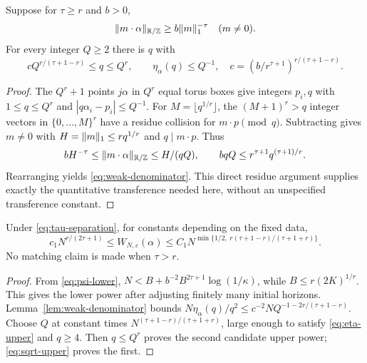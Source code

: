 \begin{lemma}\label{lem:weak-denominator}
Suppose for $\tau\ge r$ and $b>0$,
\begin{equation}\label{eq:tau-separation}
        \lVert m\cdot\alpha\rVert_{\mathbb R/\mathbb Z}\ge b\lVert m\rVert_1^{-\tau}
                         \quad(m\ne0).
\end{equation}
For every integer $Q\ge2$ there is $q$ with
\begin{equation}\label{eq:weak-denominator}
 cQ^{r/(\tau+1-r)}\le q\le Q^r,
 \qquad\eta_\alpha(q)\le Q^{-1},
 \quad c=(b/r^{\tau+1})^{r/(\tau+1-r)}.
\end{equation}
\end{lemma}
\begin{proof}
The $Q^r+1$ points $j\alpha$ in $Q^r$ equal torus boxes give integers $p_i,q$ with $1\le q\le Q^r$ and $|q\alpha_i-p_i|\le Q^{-1}$. For $M=\lfloor q^{1/r}\rfloor$, the $(M+1)^r>q$ integer vectors in $\{0,\ldots,M\}^r$ have a residue collision for $m\cdot p\pmod q$. Subtracting gives $m\ne0$ with $H=\lVert m\rVert_1\le r q^{1/r}$ and $q\mid m\cdot p$. Thus
\[
 bH^{-\tau}\le\lVert m\cdot\alpha\rVert_{\mathbb R/\mathbb Z}\le H/(qQ),
 \qquad bqQ\le r^{\tau+1}q^{(\tau+1)/r}.
\]
Rearranging yields \eqref{eq:weak-denominator}. This direct residue argument supplies exactly the quantitative transference needed here, without an unspecified transference constant.
\end{proof}

\begin{corollary}\label{cor:power-type}
Under \eqref{eq:tau-separation}, for constants depending on the fixed data,
\begin{equation}\label{eq:power-bracket}
 c_1N^{r/(2\tau+1)}\le W_{N,\varepsilon}(\alpha)
 \le C_1N^{\min\{1/2,\ r(\tau+1-r)/(\tau+1+r)\}}.
\end{equation}
No matching claim is made when $\tau>r$.
\end{corollary}
\begin{proof}
From \eqref{eq:psi-lower},
$N<B+b^{-2}B^{2\tau+1}\log(1/\kappa)$, while $B\le r(2K)^{1/r}$. This gives the lower power after adjusting finitely many initial horizons. Lemma~\ref{lem:weak-denominator} bounds
$N\eta_\alpha(q)/q^2\le c^{-2}NQ^{-1-2r/(\tau+1-r)}$.
Choose $Q$ at constant times $N^{(\tau+1-r)/(\tau+1+r)}$, large enough to satisfy \eqref{eq:eta-upper} and $q\ge4$. Then $q\le Q^r$ proves the second candidate upper power; \eqref{eq:sqrt-upper} proves the first.
\end{proof}

